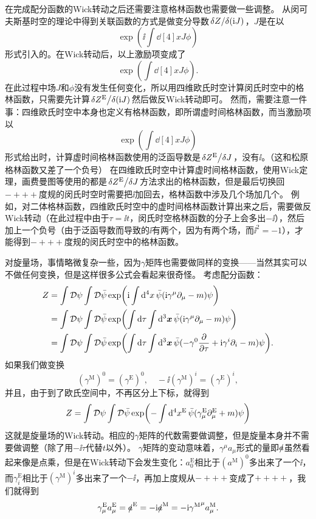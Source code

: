 在完成配分函数的Wick转动之后还需要注意格林函数也需要做一些调整。
从闵可夫斯基时空的理论中得到关联函数的方式是做变分导数$\fdv*{Z}{(\ii J)}$，$J$是在以
\[
    \exp(\ii \int \dd[4]{x} J \phi)
\]
形式引入的。在Wick转动后，以上激励项变成了
\[
    \exp(\int \dd[4]{x} J \phi).
\]
在此过程中场$J$和$\phi$没有发生任何变化，所以用四维欧氏时空计算闵氏时空中的格林函数，只需要先计算$\fdv*{Z^\text{E}}{(\ii J)}$然后做反Wick转动即可。
然而，需要注意一件事：四维欧氏时空中本身也定义有格林函数，即所谓虚时间格林函数，而当激励项以
\[
    \exp(\int \dd[4]{x} J \phi)
\]
形式给出时，计算虚时间格林函数使用的泛函导数是$\fdv*{Z^\text{E}}{J}$，没有$\ii$。（这和松原格林函数又差了一个负号）
在四维欧氏时空中计算虚时间格林函数，使用Wick定理，画费曼图等使用的都是$\fdv*{Z^\text{E}}{J}$方法求出的格林函数，但是最后切换回$-+++$度规的闵氏时空时需要把$\ii$加回去，格林函数中涉及几个场加几个。
例如，对二体格林函数，四维欧氏时空中的虚时间格林函数计算出来之后，需要做反Wick转动（在此过程中由于$\tau = \ii t$，闵氏时空格林函数的分子上会多出$-\ii$），然后加上一个负号（由于泛函导数而导致的$\ii$有两个，因为有两个场，而$\ii^2=-1$），才能得到$-+++$度规的闵氏时空中的格林函数。

对旋量场，事情略微复杂一些，因为$\gamma$矩阵也需要做同样的变换——当然其实可以不做任何变换，但是这样很多公式会看起来很奇怪。
考虑配分函数：
\[
    \begin{aligned}
        Z &= \int \mathcal{D} \psi \int \mathcal{D} \bar{\psi} \exp(\mathrm{i} \int \dd[4]{x} \bar{\psi} (\mathrm{i} \gamma^\mu \partial_\mu - m) \psi) \\
        &= \int \mathcal{D} \psi \int \mathcal{D} \bar{\psi} \exp(\int \dd{\tau} \int \dd[3]{\vb*{x}} \bar{\psi} (\mathrm{i} \gamma^\mu \partial_\mu - m) \psi) \\
        &= \int \mathcal{D} \psi \int \mathcal{D} \bar{\psi} \exp(\int \dd{\tau} \int \dd[3]{\vb*{x}} \bar{\psi} (- \gamma^0 \pdv{\tau} + \mathrm{i} \gamma^i \partial_i - m) \psi).
    \end{aligned}
\]
如果我们做变换
\begin{equation}
    (\gamma^\text{M})^0 = (\gamma^\text{E})^0, \quad - \ii (\gamma^\text{M})^i = (\gamma^\text{E})^i,
\end{equation}
并且，由于到了欧氏空间中，不再区分上下标，就得到
\begin{equation}
    Z = \int \mathcal{D} \psi \int \mathcal{D} \bar{\psi} \exp(- \int \dd[4]{x^\text{E}} \bar{\psi} (\gamma^\text{E}_\mu \partial_\mu^\text{E} + m) \psi)
\end{equation}
这就是旋量场的Wick转动。相应的$\gamma$矩阵的代数需要做调整，但是旋量本身并不需要做调整（除了用$-\ii \tau$代替$t$以外）。
$\gamma$矩阵的变动意味着，$\gamma^\mu a_\mu$形式的量即$\slashed{a}$虽然看起来像是点乘，但是在Wick转动下会发生变化：$a_0^\text{E}$相比于$(a^\text{M})^0$多出来了一个$\ii$，而$\gamma_i^\text{E}$相比于$(\gamma^\text{M})^i$多出来了一个$-\ii$，再加上度规从$-+++$变成了$++++$，我们就得到
\begin{equation}
    \gamma^\text{E}_\mu a^\text{E}_\mu = \slashed{a}^\text{E} = - \mathrm{i} \slashed{a}^\text{M} = -\mathrm{i} {\gamma^\text{M}}^\mu a^\text{M}_\mu.
\end{equation}

